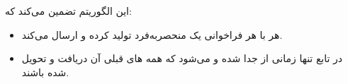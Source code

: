\bigskip

\noindent
این الگوریتم تضمین می‌کند که:
\begin{itemize}
    \item هر  با هر فراخوانی  یک  منحصربه‌فرد تولید کرده و ارسال می‌کند.
    \item در تابع  تنها زمانی  از  جدا شده و  می‌شود که همه های قبلی آن  دریافت و تحویل شده باشند.
\end{itemize}
